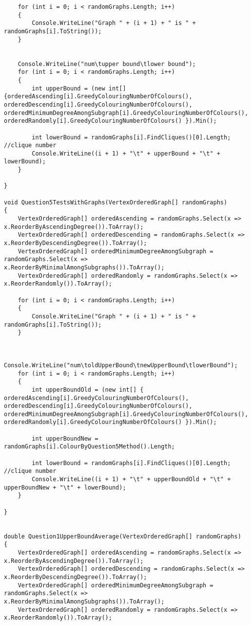 \documentclass{article}
\begin{document}
\begin{lstlisting}
	for (int i = 0; i < randomGraphs.Length; i++)
	{
		Console.WriteLine("Graph " + (i + 1) + " is " + randomGraphs[i].ToString());
	}
	
	
	Console.WriteLine("num\tupper bound\tlower bound");
	for (int i = 0; i < randomGraphs.Length; i++)
	{
		int upperBound = (new int[] {orderedAscending[i].GreedyColouringNumberOfColours(), orderedDescending[i].GreedyColouringNumberOfColours(), orderedMinimumDegreeAmongSubgraph[i].GreedyColouringNumberOfColours(), orderedRandomly[i].GreedyColouringNumberOfColours() }).Min();
		
		int lowerBound = randomGraphs[i].FindCliques()[0].Length; //clique number
		Console.WriteLine((i + 1) + "\t" + upperBound + "\t" + lowerBound);
	}
	
}

void Question5TestsWithGraphs(VertexOrderedGraph[] randomGraphs)
{
	VertexOrderedGraph[] orderedAscending = randomGraphs.Select(x => x.ReorderByAscendingDegree()).ToArray();
	VertexOrderedGraph[] orderedDescending = randomGraphs.Select(x => x.ReorderByDescendingDegree()).ToArray();
	VertexOrderedGraph[] orderedMinimumDegreeAmongSubgraph = randomGraphs.Select(x => x.ReorderByMinimalAmongSubgraphs()).ToArray();
	VertexOrderedGraph[] orderedRandomly = randomGraphs.Select(x => x.ReorderRandomly()).ToArray();
	
	for (int i = 0; i < randomGraphs.Length; i++)
	{
		Console.WriteLine("Graph " + (i + 1) + " is " + randomGraphs[i].ToString());
	}
	
	
	Console.WriteLine("num\toldUpperBound\tnewUpperBound\tlowerBound");
	for (int i = 0; i < randomGraphs.Length; i++)
	{
		int upperBoundOld = (new int[] { orderedAscending[i].GreedyColouringNumberOfColours(), orderedDescending[i].GreedyColouringNumberOfColours(), orderedMinimumDegreeAmongSubgraph[i].GreedyColouringNumberOfColours(), orderedRandomly[i].GreedyColouringNumberOfColours() }).Min();
		
		int upperBoundNew = randomGraphs[i].ColourByQuestion5Method().Length;
		
		int lowerBound = randomGraphs[i].FindCliques()[0].Length; //clique number
		Console.WriteLine((i + 1) + "\t" + upperBoundOld + "\t" + upperBoundNew + "\t" + lowerBound);
	}
	
}


double Question1UpperBoundAverage(VertexOrderedGraph[] randomGraphs)
{
	VertexOrderedGraph[] orderedAscending = randomGraphs.Select(x => x.ReorderByAscendingDegree()).ToArray();
	VertexOrderedGraph[] orderedDescending = randomGraphs.Select(x => x.ReorderByDescendingDegree()).ToArray();
	VertexOrderedGraph[] orderedMinimumDegreeAmongSubgraph = randomGraphs.Select(x => x.ReorderByMinimalAmongSubgraphs()).ToArray();
	VertexOrderedGraph[] orderedRandomly = randomGraphs.Select(x => x.ReorderRandomly()).ToArray();
	

\end{lstlisting}
\end{document}
